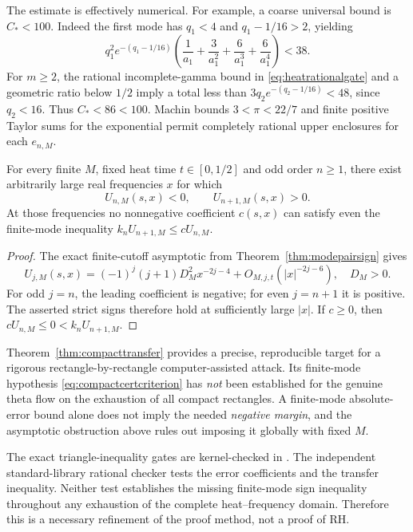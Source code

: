 The estimate is effectively numerical. For
example, a coarse universal bound is
$C_*<100$. Indeed the first mode has
$q_1<4$ and $q_1-1/16>2$, yielding
\[
q_1^2e^{-(q_1-1/16)}
\left(\frac1{a_1}+\frac3{a_1^2}
+\frac6{a_1^3}+\frac6{a_1^4}\right)<38.
\]
For $m\ge2$, the rational incomplete-gamma
bound in \eqref{eq:heatrationalgate} and
a geometric ratio below $1/2$ imply a total
less than $3q_2e^{-(q_2-1/16)}<48$,
since $q_2<16$. Thus $C_*<86<100$.
Machin bounds $3<\pi<22/7$ and finite
positive Taylor sums for the exponential
permit completely rational upper enclosures
for each $e_{n,M}$.

\begin{proposition}\label{prop:oddcutoffcomparison}
For every finite $M$, fixed heat time
$t\in[0,1/2]$ and odd order $n\ge1$,
there exist arbitrarily large real frequencies
$x$ for which
\[
U_{n,M}(s,x)<0,\qquad
U_{n+1,M}(s,x)>0 .
\]
At those frequencies no nonnegative
coefficient $c(s,x)$ can satisfy even the
finite-mode inequality
$k_nU_{n+1,M}\le cU_{n,M}$.
\end{proposition}
\begin{proof}
The exact finite-cutoff asymptotic from
Theorem~\ref{thm:modepairsign} gives
\[
U_{j,M}(s,x)=
(-1)^j(j+1)D_M^2x^{-2j-4}
+O_{M,j,t}(|x|^{-2j-6}),
\quad D_M>0.
\]
For odd $j=n$, the leading coefficient
is negative; for even $j=n+1$ it is
positive. The asserted strict signs
therefore hold at sufficiently large
$|x|$. If $c\ge0$, then
$cU_{n,M}\le0<k_nU_{n+1,M}$.
\end{proof}

Theorem~\ref{thm:compacttransfer} provides a
precise, reproducible target for a rigorous
rectangle-by-rectangle computer-assisted
attack. Its finite-mode hypothesis
\eqref{eq:compactcertcriterion} has \emph{not}
been established for the genuine theta flow
on the exhaustion of all compact rectangles.
A finite-mode absolute-error bound alone does
not imply the needed \emph{negative margin},
and the asymptotic obstruction above rules
out imposing it globally with fixed $M$.

The exact triangle-inequality gates are
kernel-checked in
.
The independent standard-library rational
checker
tests the error coefficients and the
transfer inequality. Neither test
establishes the missing finite-mode
sign inequality throughout any
exhaustion of the complete heat--frequency
domain. Therefore this is a
necessary refinement of the proof method,
not a proof of RH.
